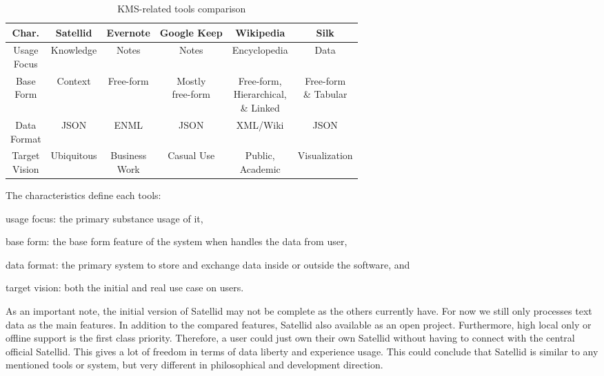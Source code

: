 \begin{table}[h!]
\centering
\begin{tabular}{ |c||c|c|c|c|c| }
\hline
Char.  & Satellid   & Evernote      & Google Keep & Wikipedia    & Silk \\ \hline
\hline
\shortstack{Usage\\Focus} & Knowledge  & Notes         & Notes       & Encyclopedia & Data \\ \hline
\shortstack{Base\\Form}   & Context    & Free-form     & \shortstack{Mostly\\free-form} & \shortstack{Free-form,\\Hierarchical,\\\& Linked} & \shortstack{Free-form\\\& Tabular} \\ \hline
\shortstack{Data\\Format} & JSON       & ENML          & JSON        & XML/Wiki     & JSON \\ \hline
\shortstack{Target\\Vision} & Ubiquitous & \shortstack{Business\\Work} & Casual Use  & \shortstack{Public,\\Academic} & Visualization \\
\hline
\end{tabular}
\caption{KMS-related tools comparison}
\label{table:kms-comparison}
\end{table}

The characteristics define each tools:
\begin{inparaenum}[\itshape 1\upshape)]
\item usage focus: the primary substance usage of it,
\item base form: the base form feature of the system when handles the data from user,
\item data format: the primary system to store and exchange data inside or outside the software, and
\item target vision: both the initial and real use case on users.
\end{inparaenum}
As an important note, the initial version of Satellid may not be complete as the others currently have.
For now we still only processes text data as the main features.
In addition to the compared features, Satellid also available as an open project.
Furthermore, high local only or offline support is the first class priority.
Therefore, a user could just own their own Satellid without having to connect with the central official Satellid.
This gives a lot of freedom in terms of data liberty and experience usage.
This could conclude that Satellid is similar to any mentioned tools or system, but very different in philosophical and development direction.
